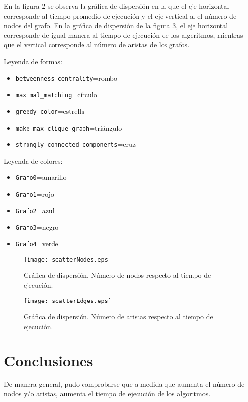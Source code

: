\documentclass{article}
\begin{document}
En la figura 2 se observa la gráfica de dispersión en la que el eje horizontal corresponde al tiempo promedio de ejecución y el eje vertical al el número de nodos del grafo. En la gráfica de dispersión de la figura 3, el eje horizontal corresponde de igual manera al tiempo de ejecución de los algoritmos, mientras que el vertical corresponde al número de aristas de los grafos. 

Leyenda de formas:
\begin{itemize}
\item \texttt{betweenness\_centrality}=rombo
\item \texttt{maximal\_matching}=círculo
\item \texttt{greedy\_color}=estrella
\item \texttt{make\_max\_clique\_graph}=triángulo
\item \texttt{strongly\_connected\_components}=cruz
\end{itemize}

Leyenda de colores:
\begin{itemize}
\item \texttt{Grafo0}=amarillo
\item \texttt{Grafo1}=rojo
\item \texttt{Grafo2}=azul
\item \texttt{Grafo3}=negro
\item \texttt{Grafo4}=verde
\end{itemize}
\begin{figure}
\begin{center}
  \texttt{[image: scatterNodes.eps]}
   \end{center}
   \vspace*{-10mm}
  \caption{Gráfica de dispersión. Número de nodos respecto al tiempo de ejecución.}
  \label{figura 2} 
\end{figure}

\begin{figure}
\begin{center}
  \texttt{[image: scatterEdges.eps]}
   \end{center}
   \vspace*{-10mm}
  \caption{Gráfica de dispersión. Número de aristas respecto al tiempo de ejecución.}
  \label{figura 3} 
\end{figure}


\section*{Conclusiones}

De manera general, pudo comprobarse que a medida que aumenta el número de nodos y/o aristas, aumenta el tiempo de ejecución de los algoritmos.





\newpage


\end{document}
